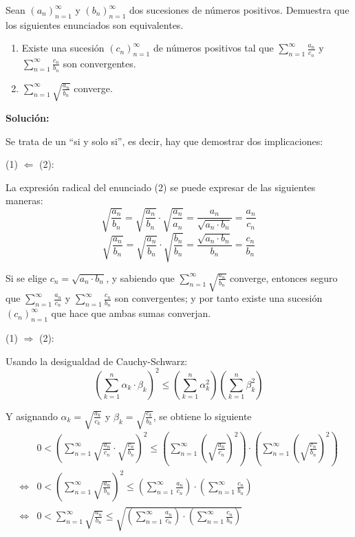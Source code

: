 \documentclass[../../main.tex]{subfiles}
\begin{document}
  \begin{shaded}
    Sean $(a_n)_{n = 1}^\infty$ y $(b_n)_{n = 1}^\infty$ dos sucesiones de números positivos. Demuestra que los siguientes enunciados son equivalentes.

    \begin{enumerate}[(1)]
      \item Existe una sucesión $(c_n)_{n = 1}^\infty$ de números positivos tal que $\displaystyle\sum_{n = 1}^\infty \frac{a_n}{c_n}$ y $\displaystyle\sum_{n = 1}^\infty \frac{c_n}{b_n}$ son convergentes.
      \item $\displaystyle\sum_{n = 1}^\infty \sqrt{\frac{a_n}{b_n}}$ converge.
    \end{enumerate}
  \end{shaded}

  \textbf{Solución:}

  Se trata de un ``si y solo si'', es decir, hay que demostrar dos implicaciones:

  (1) $\Longleftarrow$ (2):

  La expresión radical del enunciado (2) se puede expresar de las siguientes maneras:
  $$
  \sqrt{\frac{a_n}{b_n}} = \sqrt{\frac{a_n}{b_n}} \cdot \sqrt{\frac{a_n}{a_n}} = \frac{a_n}{\sqrt{a_n \cdot b_n}} = \frac{a_n}{c_n}
  $$
  $$
  \sqrt{\frac{a_n}{b_n}} = \sqrt{\frac{a_n}{b_n}} \cdot \sqrt{\frac{b_n}{b_n}} = \frac{\sqrt{a_n \cdot b_n}}{b_n} = \frac{c_n}{b_n}
  $$

  Si se elige $c_n = \sqrt{a_n \cdot b_n}$, y sabiendo que $\displaystyle\sum_{n = 1}^\infty \sqrt{\frac{a_n}{b_n}}$ converge, entonces seguro que $\displaystyle\sum_{n = 1}^\infty \frac{a_n}{c_n}$ y $\displaystyle\sum_{n = 1}^\infty \frac{c_n}{b_n}$ son convergentes; y por tanto existe una sucesión $(c_n)_{n = 1}^\infty$ que hace que ambas sumas converjan.

  (1) $\Longrightarrow$ (2):

  Usando la desigualdad de Cauchy-Schwarz:
  $$
  \left(\sum _{k = 1}^n \alpha_k \cdot \beta_k\right)^2 \leq \left(\sum _{k = 1}^n \alpha_k^2\right)\left(\sum _{k=1}^n \beta_k^2\right)
  $$

  Y asignando $\alpha_k = \displaystyle\sqrt{\frac{a_k}{c_k}}$ y $\beta_k = \displaystyle\sqrt{\frac{c_k}{b_k}}$, se obtiene lo siguiente
  \begin{equation*}
    \begin{split}
      & 0 < \left(\sum_{n = 1}^\infty \sqrt{\frac{a_n}{c_n}} \cdot \sqrt{\frac{c_n}{b_n}}\right)^2 \leq \left(\sum_{n = 1}^\infty \left(\sqrt{\frac{a_n}{c_n}}\right)^2\right)
      \cdot
      \left(\sum_{n = 1}^\infty \left(\sqrt{\frac{c_n}{b_n}}\right)^2\right) \\ \iff &
      0 < \left(\sum_{n = 1}^\infty \sqrt{\frac{a_n}{b_n}}\right)^2 \leq \left(\sum_{n = 1}^\infty \frac{a_n}{c_n}\right) 
      \cdot
      \left(\sum_{n = 1}^\infty \frac{c_n}{b_n}\right) \\ \iff &
      0 < \sum_{n = 1}^\infty \sqrt{\frac{a_n}{b_n}} \leq \sqrt{\left(\sum_{n = 1}^\infty \frac{a_n}{c_n}\right) 
      \cdot
      \left(\sum_{n = 1}^\infty \frac{c_n}{b_n}\right)}
    \end{split}
  \end{equation*}
\end{document}
